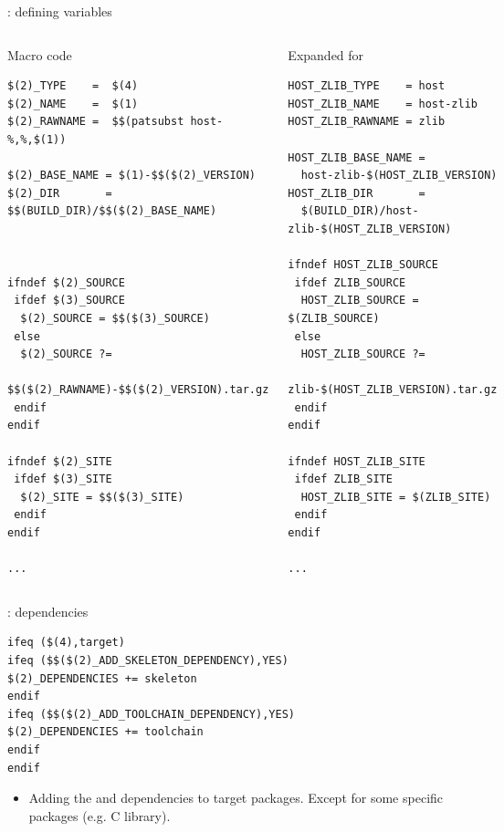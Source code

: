 \begin{frame}[fragile]{: defining variables}

\begin{columns}

\begin{block}{Macro code}
\begin{verbatim}
$(2)_TYPE    =  $(4)
$(2)_NAME    =  $(1)
$(2)_RAWNAME =  $$(patsubst host-%,%,$(1))

$(2)_BASE_NAME = $(1)-$$($(2)_VERSION)
$(2)_DIR       = $$(BUILD_DIR)/$$($(2)_BASE_NAME)



ifndef $(2)_SOURCE
 ifdef $(3)_SOURCE
  $(2)_SOURCE = $$($(3)_SOURCE)
 else
  $(2)_SOURCE ?=
    $$($(2)_RAWNAME)-$$($(2)_VERSION).tar.gz
 endif
endif

ifndef $(2)_SITE
 ifdef $(3)_SITE
  $(2)_SITE = $$($(3)_SITE)
 endif
endif

...
\end{verbatim}
\end{block}

\begin{block}{Expanded for }
\begin{verbatim}
HOST_ZLIB_TYPE    = host
HOST_ZLIB_NAME    = host-zlib
HOST_ZLIB_RAWNAME = zlib

HOST_ZLIB_BASE_NAME =
  host-zlib-$(HOST_ZLIB_VERSION)
HOST_ZLIB_DIR       =
  $(BUILD_DIR)/host-zlib-$(HOST_ZLIB_VERSION)

ifndef HOST_ZLIB_SOURCE
 ifdef ZLIB_SOURCE
  HOST_ZLIB_SOURCE = $(ZLIB_SOURCE)
 else
  HOST_ZLIB_SOURCE ?=
   zlib-$(HOST_ZLIB_VERSION).tar.gz
 endif
endif

ifndef HOST_ZLIB_SITE
 ifdef ZLIB_SITE
  HOST_ZLIB_SITE = $(ZLIB_SITE)
 endif
endif

...
\end{verbatim}
\end{block}

\end{columns}

\end{frame}

\begin{frame}[fragile]{: dependencies}

\begin{block}{}
\begin{verbatim}
ifeq ($(4),target)
ifeq ($$($(2)_ADD_SKELETON_DEPENDENCY),YES)
$(2)_DEPENDENCIES += skeleton
endif
ifeq ($$($(2)_ADD_TOOLCHAIN_DEPENDENCY),YES)
$(2)_DEPENDENCIES += toolchain
endif
endif
\end{verbatim}
\end{block}

\begin{itemize}
\item Adding the  and  dependencies to
  target packages. Except for some specific packages (e.g. C library).
\end{itemize}
\end{frame}

